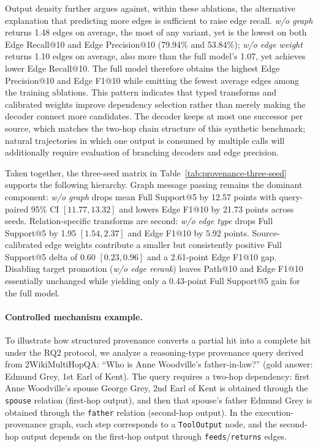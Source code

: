 Output density further argues against, within these ablations, the
alternative explanation that predicting more edges is sufficient to raise
edge recall. \emph{w/o graph}
returns 1.48 edges on average, the most of any variant, yet is the lowest
on both Edge Recall@10 and Edge Precision@10 (79.94\% and 53.84\%); \emph{w/o
edge weight} returns 1.10 edges on
average, also more than the full model's 1.07, yet achieves lower Edge
Recall@10. The full model therefore obtains the highest Edge Precision@10 and Edge
F1@10 while emitting the fewest average edges among the training ablations.
This pattern indicates that typed transforms and calibrated weights improve
dependency selection rather than merely making the decoder connect more
candidates.
The decoder keeps at most one
successor per source, which matches the two-hop chain structure of this
synthetic benchmark; natural trajectories in which one output is consumed
by multiple calls will additionally require evaluation of branching
decoders and edge precision.

Taken together, the three-seed matrix in Table~\ref{tab:provenance-three-seed}
supports the following hierarchy. Graph message passing remains the dominant
component: \emph{w/o graph} drops mean Full Support@5 by 12.57 points with
query-paired 95\% CI $[11.77, 13.32]$ and lowers Edge F1@10 by 21.73 points
across seeds. Relation-specific transforms are second: \emph{w/o edge type}
drops Full Support@5 by 1.95 $[1.54, 2.37]$ and Edge F1@10 by 5.92 points.
Source-calibrated edge weights contribute a smaller but consistently positive
Full Support@5 delta of 0.60 $[0.23, 0.96]$ and a 2.61-point Edge F1@10 gap.
Disabling target promotion (\emph{w/o edge rerank}) leaves Path@10 and Edge
F1@10 essentially unchanged while yielding only a 0.43-point Full Support@5
gain for the full model.

\paragraph{Controlled mechanism example.}
To illustrate how structured provenance converts a partial hit into a
complete hit under the RQ2 protocol, we analyze a reasoning-type
provenance query derived from 2WikiMultiHopQA: ``Who is Anne Woodville's father-in-law?'' (gold
answer: Edmund Grey, 1st Earl of Kent). The query requires a two-hop
dependency: first Anne Woodville's spouse George Grey, 2nd Earl of Kent
is obtained through the \texttt{spouse} relation (first-hop output), and
then that spouse's father Edmund Grey is obtained through the
\texttt{father} relation (second-hop output). In the execution-provenance
graph, each step corresponds to a \texttt{ToolOutput} node, and the
second-hop output depends on the first-hop output through
\texttt{feeds}/\texttt{returns} edges.

